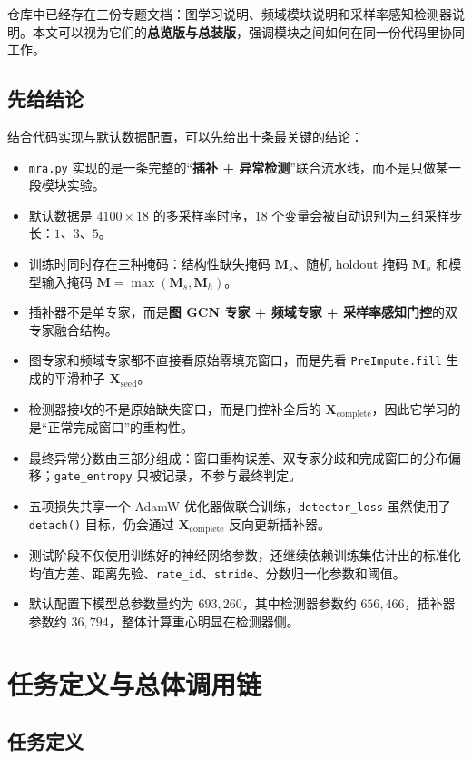 \documentclass[UTF8]{ctexart}
\newcommand{\code}[1]{\texttt{#1}}
\begin{document}
仓库中已经存在三份专题文档：图学习说明、频域模块说明和采样率感知检测器说明。本文可以视为它们的\textbf{总览版与总装版}，强调模块之间如何在同一份代码里协同工作。

\subsection{先给结论}

结合代码实现与默认数据配置，可以先给出十条最关键的结论：
\begin{itemize}
    \item \code{mra.py} 实现的是一条完整的“\textbf{插补 + 异常检测}”联合流水线，而不是只做某一段模块实验。
    \item 默认数据是 \(4100 \times 18\) 的多采样率时序，18 个变量会被自动识别为三组采样步长：\(1\)、\(3\)、\(5\)。
    \item 训练时同时存在三种掩码：结构性缺失掩码 \(\bm{M}_s\)、随机 holdout 掩码 \(\bm{M}_h\) 和模型输入掩码 \(\bm{M}=\max(\bm{M}_s,\bm{M}_h)\)。
    \item 插补器不是单专家，而是\textbf{图 GCN 专家 + 频域专家 + 采样率感知门控}的双专家融合结构。
    \item 图专家和频域专家都不直接看原始零填充窗口，而是先看 \code{PreImpute.fill} 生成的平滑种子 \(\bm{X}_{\text{seed}}\)。
    \item 检测器接收的不是原始缺失窗口，而是门控补全后的 \(\bm{X}_{\text{complete}}\)，因此它学习的是“正常完成窗口”的重构性。
    \item 最终异常分数由三部分组成：窗口重构误差、双专家分歧和完成窗口的分布偏移；\code{gate\_entropy} 只被记录，不参与最终判定。
    \item 五项损失共享一个 AdamW 优化器做联合训练，\code{detector\_loss} 虽然使用了 \code{detach()} 目标，仍会通过 \(\bm{X}_{\text{complete}}\) 反向更新插补器。
    \item 测试阶段不仅使用训练好的神经网络参数，还继续依赖训练集估计出的标准化均值方差、距离先验、\code{rate\_id}、\code{stride}、分数归一化参数和阈值。
    \item 默认配置下模型总参数量约为 \(693{,}260\)，其中检测器参数约 \(656{,}466\)，插补器参数约 \(36{,}794\)，整体计算重心明显在检测器侧。
\end{itemize}

\section{任务定义与总体调用链}

\subsection{任务定义}
\end{document}

